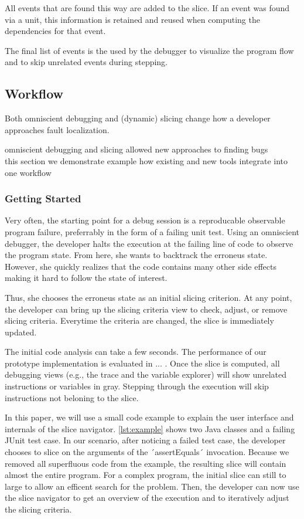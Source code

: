 \documentclass[english]{scrartcl}
\begin{document}
All events that are found this way are added to the slice.
If an event was found via a unit, this information is retained and reused when computing the dependencies for that event.

The final list of events is the used by the debugger to visualize the program flow and to skip unrelated events during stepping.


\subsection{Workflow}

Both omniscient debugging and (dynamic) slicing change how a developer approaches fault localization.

omniscient debugging and slicing allowed new approaches to finding bugs\\
this section we demonstrate example how existing and new tools integrate into one workflow\\

\subsubsection{Getting Started}

Very often, the starting point for a debug session is a reproducable observable program failure, preferrably in the form of a failing unit test.
Using an omniscient debugger, the developer halts the execution at the failing line of code to observe the program state.
From here, she wants to backtrack the erroneus state.
However, she quickly realizes that the code contains many other side effects making it hard to follow the state of interest.

Thus, she chooses the erroneus state as an initial slicing criterion. 
At any point, the developer can bring up the slicing criteria view to check, adjust, or remove slicing criteria.
Everytime the criteria are changed, the slice is immediately updated.

The initial code analysis can take a few seconds.
The performance of our prototype implementation is evaluated in ... .
Once the slice is computed, all debugging views (e.g., the trace and the variable explorer) will show unrelated instructions or variables in gray.
Stepping through the execution will skip instructions not beloning to the slice.

In this paper, we will use a small code example to explain the user interface and internals of the slice navigator. 
\autoref{lst:example} shows two Java classes and a failing JUnit test case.
In our scenario, after noticing a failed test case, the developer chooses to slice on the arguments of the ´assertEquals´ invocation.
Because we removed all superfluous code from the example, the resulting slice will contain almost the entire program.
For a complex program, the initial slice can still to large to allow an efficent search for the problem.
Then, the developer can now use the slice navigator to get an overview of the execution and to iteratively adjust the slicing criteria.
\end{document}
